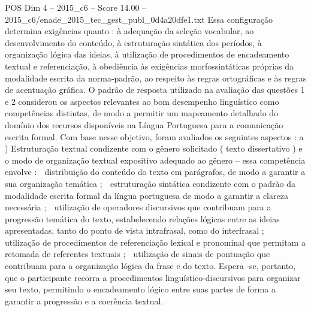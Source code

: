 \begin{textsample}{POS Dim 4 – 2015\_c6 – Score 14.00 – 2015\_c6/enade\_2015\_tec\_gest\_publ\_0d4a20dfe1.txt}
Essa configuração determina exigências quanto : à adequação da seleção vocabular, ao desenvolvimento do conteúdo, à estruturação sintática dos períodos, à organização lógica das ideias, à utilização de procedimentos de encadeamento textual e referenciação, à obediência às exigências morfossintáticas próprias da modalidade escrita da norma-padrão, ao respeito às regras ortográficas e às regras de acentuação gráfica.
O padrão de resposta utilizado na avaliação das questões 1 e 2 considerou os aspectos relevantes ao bom desempenho linguístico como competências distintas, de modo a permitir um mapeamento detalhado do domínio dos recursos disponíveis na Língua Portuguesa para a comunicação escrita formal.
Com base nesse objetivo, foram avaliados os seguintes aspectos : a ) Estruturação textual condizente com o gênero solicitado ( texto dissertativo ) e o modo de organização textual expositivo adequado ao gênero – essa competência envolve :  distribuição do conteúdo do texto em parágrafos, de modo a garantir a sua organização temática ;  estruturação sintática condizente com o padrão da modalidade escrita formal da língua portuguesa de modo a garantir a clareza necessária ;  utilização de operadores discursivos que contribuam para a progressão temática do texto, estabelecendo relações lógicas entre as ideias apresentadas, tanto do ponto de vista intrafrasal, como do interfrasal ;  utilização de procedimentos de referenciação lexical e pronominal que permitam a retomada de referentes textuais ;  utilização de sinais de pontuação que contribuam para a organização lógica da frase e do texto.
Espera -se, portanto, que o participante recorra a procedimentos linguístico-discursivos para organizar seu texto, permitindo o encadeamento lógico entre suas partes de forma a garantir a progressão e a coerência textual.

\end{textsample}
